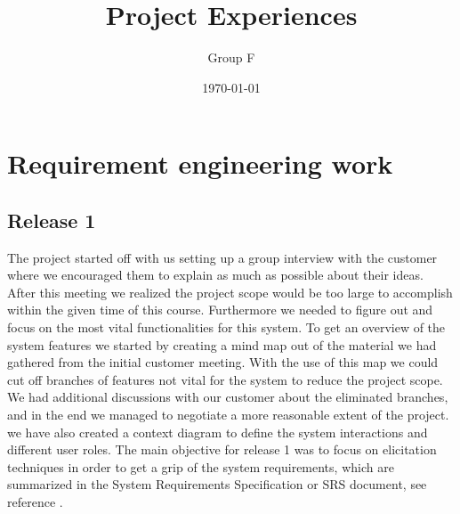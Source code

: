 \documentclass[10pt]{article}
\begin{document}
\makeatletter
\renewcommand{\@biblabel}[1]{\quad#1.}
\makeatother


\pagestyle{myheadings}





\begin{titlepage}
\title{Project Experiences}
\author{Group F}
\date{\today}
\maketitle
\thispagestyle{empty}
\end{titlepage}

\tableofcontents
\thispagestyle{empty}
\newpage
{}

\section{Requirement engineering work}

\subsection{Release 1}
The project started off with us setting up a group interview with the customer where we encouraged them to explain as much as possible about their ideas. After this meeting we realized the project scope would be too large to accomplish within the given time of this course. Furthermore we needed to figure out and focus on the most vital functionalities for this system.
To get an overview of the system features we started by creating a mind map out of the material we had gathered from the initial customer meeting. With the use of this map we could cut off branches of features not vital for the system to reduce the project scope.
We had additional discussions with our customer about the eliminated branches, and in the end we managed to negotiate a more reasonable extent of the project.
\newline we have also created a context diagram to define the system interactions and different user roles.
The main objective for release 1 was to focus on elicitation techniques in order to get a grip of the system requirements, which are summarized in the System Requirements Specification or SRS document, see reference \cite{srs}.
\end{document}
